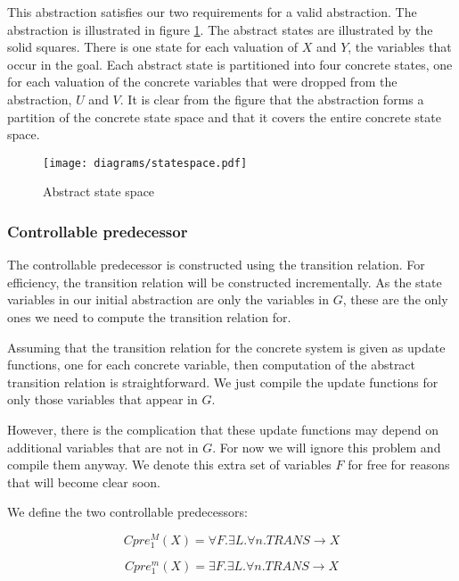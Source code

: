 \documentclass{book}
\theoremstyle{definition}
\begin{document}
This abstraction satisfies our two requirements for a valid abstraction. The abstraction is illustrated in figure \ref{fig:abs_state_sp}. The abstract states are illustrated by the solid squares. There is one state for each valuation of $X$ and $Y$, the variables that occur in the goal. Each abstract state is partitioned into four concrete states, one for each valuation of the concrete variables that were dropped from the abstraction, $U$ and $V$. It is clear from the figure that the abstraction forms a partition of the concrete state space and that it covers the entire concrete state space.

\begin{figure}[t]
\centering
\texttt{[image: diagrams/statespace.pdf]}
\caption{Abstract state space}
\label{fig:abs_state_sp}
\end{figure}

\subsubsection{Controllable predecessor}

The controllable predecessor is constructed using the transition relation. For efficiency, the transition relation will be constructed incrementally. As the state variables in our initial abstraction are only the variables in $G$, these are the only ones we need to compute the transition relation for.

Assuming that the transition relation for the concrete system is given as update functions, one for each concrete variable, then computation of the abstract transition relation is straightforward. We just compile the update functions for only those variables that appear in $G$.

However, there is the complication that these update functions may depend on additional variables that are not in $G$. For now we will ignore this problem and compile them anyway. We denote this extra set of variables $F$ for free for reasons that will become clear soon.

We define the two controllable predecessors:

\begin{equation}
    Cpre_1^M(X) = \forall F. \exists L. \forall n. TRANS \rightarrow X
\end{equation}

\begin{equation}
    Cpre_1^m(X) = \exists F. \exists L. \forall n. TRANS \rightarrow X
\end{equation}
\end{document}
